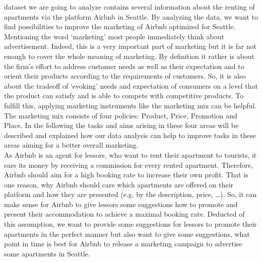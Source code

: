 \documentclass[journal]{IEEEtran}
\begin{document}
 dataset we are going to analyze contains several information about the renting of apartments via the platform Airbnb in Seattle. By analyzing the data, we want to find possibilities to improve the marketing of Airbnb optimized for Seattle. Mentioning the word ‘marketing’ most people immediately think about advertisement. Indeed, this is a very important part of marketing but it is far not enough to cover the whole meaning of marketing. By definition it rather is about the firm’s effort to address customer needs as well as their expectation and to orient their products according to the requirements of customers. So, it is also about the tradeoff of ‘evoking’ needs and expectation of consumers on a level that the product can satisfy and is able to compete with competitive products. To fulfill this, applying marketing instruments like the marketing mix can be helpful. The marketing mix consists of four policies: Product, Price, Promotion and Place. In the following the tasks and aims arising in these four areas will be described and explained how our data analysis can help to improve tasks in these areas aiming for a better overall marketing.\\As Airbnb is an agent for lessors, who want to rent their apartment to tourists, it ears its money by receiving a commission for every rented apartment. Therefore, Airbnb should aim for a high booking rate to increase their own profit. That is one reason, why Airbnb should care which apartments are offered on their platform and how they are presented (e.g. by the description, price, …). So, it can make sense for Airbnb to give lessors some suggestions how to promote and present their accommodation to achieve a maximal booking rate. Deducted of this assumption, we want to provide some suggestions for lessors to promote their apartments in the perfect manner but also want to give some suggestions, what point in time is best for Airbnb to release a marketing campaign to advertise some apartments in Seattle. 
\end{document}
